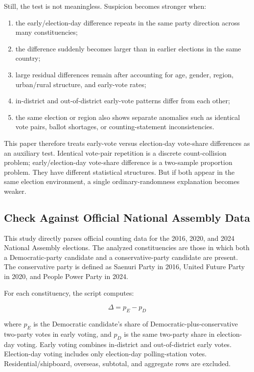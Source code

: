 \documentclass[preprint]{IEIE}
\begin{document}
Still, the test is not meaningless. Suspicion becomes stronger when:

\begin{enumerate}
\item the early/election-day difference repeats in the same party direction across many constituencies;
\item the difference suddenly becomes larger than in earlier elections in the same country;
\item large residual differences remain after accounting for age, gender, region, urban/rural structure, and early-vote rates;
\item in-district and out-of-district early-vote patterns differ from each other;
\item the same election or region also shows separate anomalies such as identical vote pairs, ballot shortages, or counting-statement inconsistencies.
\end{enumerate}

This paper therefore treats early-vote versus election-day vote-share differences as an auxiliary test. Identical vote-pair repetition is a discrete count-collision problem; early/election-day vote-share difference is a two-sample proportion problem. They have different statistical structures. But if both appear in the same election environment, a single ordinary-randomness explanation becomes weaker.

\subsection{Check Against Official National Assembly Data}

This study directly parses official counting data for the 2016, 2020, and 2024 National Assembly elections. The analyzed constituencies are those in which both a Democratic-party candidate and a conservative-party candidate are present. The conservative party is defined as Saenuri Party in 2016, United Future Party in 2020, and People Power Party in 2024.

For each constituency, the script computes:

\[
\Delta = p_E - p_D
\]

where \(p_E\) is the Democratic candidate's share of Democratic-plus-conservative two-party votes in early voting, and \(p_D\) is the same two-party share in election-day voting. Early voting combines in-district and out-of-district early votes. Election-day voting includes only election-day polling-station votes. Residential/shipboard, overseas, subtotal, and aggregate rows are excluded.
\end{document}
